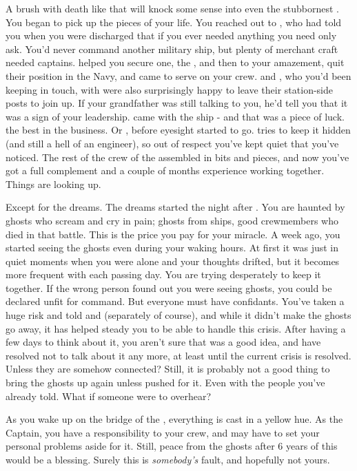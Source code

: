 \documentclass[char]{TMFHope}
\begin{document}
A brush with death like that will knock some sense into even the stubbornest \cCap{\human}. You began to pick up the pieces of your life. You reached out to \cXO{}, who had told you when you were discharged that if you ever needed anything you need only ask. You'd never command another military ship, but plenty of merchant craft needed captains. \cXO{} helped you secure one, the \pNew{}, and then to your amazement, quit their position in the Navy, and came to serve on your crew. \cMed{} and \cSci{}, who you'd been keeping in touch, with were also surprisingly happy to leave their station-side posts to join up. If your grandfather was still talking to you, he'd tell you that it was a sign of your leadership. \cEng{} came with the ship - and that was a piece of luck. \cEng{\They} \cEng{\are} the best in the business. Or \cEng{\were}, before \cEng{\their} eyesight started to go. \cEng{} tries to keep it hidden (and \cEng{\they} \cEng{\are} still a hell of an engineer), so out of respect you've kept quiet that you've noticed. The rest of the crew of the \pNew{} assembled in bits and pieces, and now you've got a full complement and a couple of months experience working together. Things are looking up.

Except for the dreams. The dreams started the night after \pBattle{}. You are haunted by ghosts who scream and cry in pain; ghosts from \pPlan{} ships, good crewmembers who died in that battle. This is the price you pay for your miracle.	A week ago, you started seeing the ghosts even during your waking hours. At first it was just in quiet moments when you were alone and your thoughts drifted, but it becomes more frequent with each passing day. You are trying desperately to keep it together. If the wrong person found out you were seeing ghosts, you could be declared unfit for command. But everyone must have confidants. You've taken a huge risk and told \cMed{} and \cSci{} (separately of course), and while it didn't make the ghosts go away, it has helped steady you to be able to handle this crisis. After having a few days to think about it, you aren't sure that was a good idea, and have resolved not to talk about it any more, at least until the current crisis is resolved. Unless they are somehow connected? Still, it is probably not a good thing to bring the ghosts up again unless pushed for it. Even with the people you've already told. What if someone were to overhear?

As you wake up on the bridge of the \pNew{}, everything is cast in a yellow hue. As the Captain, you have a responsibility to your crew, and may have to set your personal problems aside for it. Still, peace from the ghosts after 6 years of this would be a blessing. Surely this is \emph{somebody's} fault, and hopefully not yours. 
\end{document}
